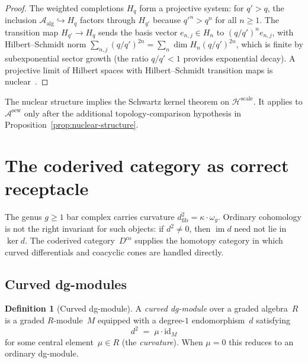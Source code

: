 \documentclass[11pt,reqno]{amsart}
\theoremstyle{definition}
\newtheorem{definition}[theorem]{Definition}
\theoremstyle{remark}
\newcommand{\cA}{\mathcal{A}}
\newcommand{\id}{\mathrm{id}}
\newcommand{\Dco}{D^{\mathrm{co}}}
\numberwithin{equation}{section}
\begin{document}
\begin{proof}
The weighted completions $H_q$ form a projective system: for
$q' > q$, the inclusion
$\cA_{\mathrm{alg}} \hookrightarrow H_q$ factors through
$H_{q'}$ because $q'^n > q^n$ for all $n \geq 1$.  The
transition map $H_{q'} \to H_q$ sends the basis vector
$e_{n,j} \in H_n$ to $(q/q')^n e_{n,j}$, with
Hilbert--Schmidt norm
$\sum_{n,j}(q/q')^{2n} = \sum_n \dim H_n (q/q')^{2n}$,
which is finite by subexponential sector growth (the ratio
$q/q' < 1$ provides exponential decay).  A projective limit
of Hilbert spaces with Hilbert--Schmidt transition maps is
nuclear~\cite{RS72}.
\end{proof}

The nuclear structure implies the Schwartz kernel theorem on
$\mathcal H^{\mathrm{scale}}$. It applies to
$\cA^{\mathrm{sew}}$ only after the additional topology-comparison
hypothesis in Proposition~\ref{prop:nuclear-structure}.



\section{The coderived category as correct receptacle}
\label{sec:coderived}

The genus $g \geq 1$ bar complex carries curvature
$d_{\mathrm{fib}}^2 = \kappa \cdot \omega_g$. Ordinary cohomology
is not the right invariant for such objects: if $d^2\neq0$, then
$\operatorname{im}d$ need not lie in $\ker d$. The coderived
category~$\Dco$ supplies the homotopy category in which curved
differentials and coacyclic cones are handled directly.

\subsection{Curved dg-modules}\label{subsec:curved-dg}

\begin{definition}[Curved dg-module]\label{def:curved-dg}
A \emph{curved dg-module} over a graded algebra~$R$ is a
graded $R$-module~$M$ equipped with a degree-$1$
endomorphism~$d$ satisfying
\[
d^2 \;=\; \mu \cdot \id_M
\]
for some central element~$\mu \in R$ (the \emph{curvature}).
When $\mu = 0$ this reduces to an ordinary dg-module.
\end{definition}
\end{document}

